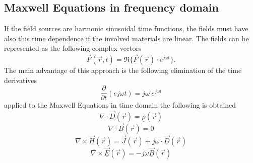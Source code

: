 \subsection{Maxwell Equations in frequency domain}
If the field sources are harmonic sinusoidal time functions, the fields must have also this time dependence if the involved materials are linear. The fields can be represented as the following complex vectors
\begin{equation*}
	\vec{F}\left(\vec{r},t\right) = \Re\{\underline{\vec{F}}\left(\vec{r}\right) \cdot e^{j\omega t}\}.
\end{equation*}
The main advantage of this approach is the following elimination of the time derivatives
\begin{equation*}
	\frac{\partial}{\partial t}\left(e{j \omega t}\right) = j \omega^\cdot e^{j \omega t}
\end{equation*}
applied to the Maxwell Equations in time domain the following is obtained
\begin{equation*}
	\nabla \cdot \underline{\vec{D}}\left(\vec{r}\right) = \underline{\rho}\left(\vec{r}\right)
\end{equation*}
\begin{equation*}
	\nabla \cdot \underline{\vec{B}}\left(\vec{r}\right) = 0
\end{equation*}
\begin{equation*}
	\nabla \times \underline{\vec{H}}\left(\vec{r}\right) = \underline{\vec{J}}\left(\vec{r}\right) + j \omega \cdot \underline{\vec{D}}\left(\vec{r}\right)
\end{equation*}
\begin{equation*}
	\nabla \times \underline{\vec{E}}\left(\vec{r}\right) = - j\omega \underline{\vec{B}}\left(\vec{r}\right)
\end{equation*}